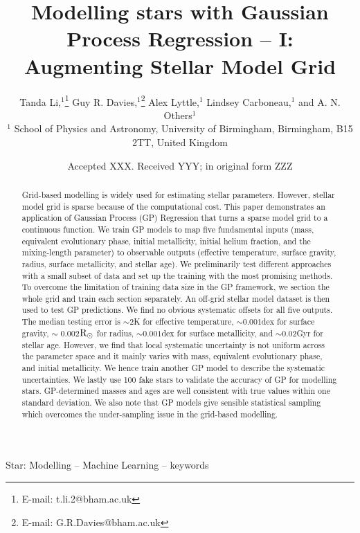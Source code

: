 \documentclass[fleqn,usenatbib]{mnras}
\title[Modelling stars with GP]{Modelling stars with Gaussian Process Regression -- I:  Augmenting Stellar Model Grid}
\author[T. Li et al.]{
Tanda Li,$^{1}$\thanks{E-mail: t.li.2@bham.ac.uk}
Guy R. Davies,$^{1}$\thanks{E-mail: G.R.Davies@bham.ac.uk}
Alex Lyttle,$^{1}$
Lindsey Carboneau,$^{1}$
and A. N. Others$^{1}$
\\
$^{1}$ School of Physics and Astronomy, University of Birmingham, Birmingham, B15 2TT, United Kingdom\\
}
\date{Accepted XXX. Received YYY; in original form ZZZ}
\begin{document}
\label{firstpage}
\pagerange{\pageref{firstpage}--\pageref{lastpage}}
\maketitle

\begin{abstract}
Grid-based modelling is widely used for estimating stellar parameters. However, stellar model grid is sparse because of the computational cost. This paper demonstrates an application of Gaussian Process (GP) Regression that turns a sparse model grid to a continuous function. We train GP models to map five fundamental inputs (mass, equivalent evolutionary phase, initial metallicity, initial helium fraction, and the mixing-length parameter) to observable outputs (effective temperature, surface gravity, radius, surface metallicity, and stellar age). 
%
We preliminarily test different approaches with a small subset of data and set up the training with the most promising methods. To overcome the limitation of training data size in the GP framework, we section the whole grid and train each section separately. 
%
An off-grid stellar model dataset is then used to test GP predictions. We find no obvious systematic offsets for all five outputs. The median testing error is $\sim$2K for effective temperature, $\sim 0.001$dex for surface gravity, $\sim$ 0.002$\rm R_{\odot}$ for radius, $\sim 0.001$dex for surface metallicity, and $\sim$0.02Gyr for stellar age. However, we find that local systematic uncertainty is not uniform across the parameter space and it mainly varies with mass, equivalent evolutionary phase, and initial metallicity. We hence train another GP model to describe the systematic uncertainties.      
%
We lastly use 100 fake stars to validate the accuracy of GP for modelling stars. GP-determined masses and ages are well consistent with true values within one standard deviation. We also note that GP models give sensible statistical sampling which overcomes the under-sampling issue in the grid-based modelling. 
%
\end{abstract}

\begin{keywords}
Star: Modelling -- Machine Learning -- keywords
\end{keywords}


%
\end{document}
